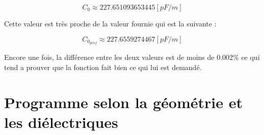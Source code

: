 \begin{equation}
	C_0 \approx 227.651093653445[pF/m]
\end{equation}

Cette valeur est très proche de la valeur fournie qui est la suivante :

\begin{equation}
	C_{0_{prof}} \approx 227.6559274467 [pF/m]
\end{equation}

Encore une fois, la différence entre les deux valeurs est de moins de 0.002\% ce qui tend a prouver que la fonction fait bien ce qui lui est demandé.

\section{Programme selon la géométrie et les diélectriques}
